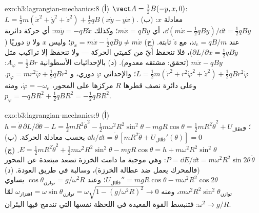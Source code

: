 \begin{solution}{exo:b3:lagrangian-mechanics:8}
(أ) $\vect A = \tfrac12 B(-y, x, 0)$:
$L = \tfrac12 m(\dot x^2 + \dot y^2 + \dot z^2) + \tfrac12 qB(x\dot y -
y\dot x)$. (ب) معادلة $x$: $\dd(m\dot x - \tfrac12 qBy)/\dd t =
\tfrac12 qB\dot y$، أي $m\ddot x = qB\dot y$؛ وكذلك $m\ddot y =
-qB\dot x$: أي حركة دائرية عند $\omega_{\text{c}} = qB/m$، مع $\dot z$
ثابتة. (ج) $p_x = m\dot x - \tfrac12 qBy \neq m\dot x$؛ وليس $x$
ولا $y$ دوريًا ($\partial L/\partial x = \tfrac12 qB\dot y$)، فلا
تنحفظ أيّ من كميتي الحركة --- ولا تنحفظ إلا تراكيب مثل $m\dot x -
qBy$ (تحقق: مشتقه معدوم). (د) بالإحداثيات الأسطوانية
$A_\varphi = \tfrac12 Br$:
$L = \tfrac12 m(\dot r^2 + r^2\dot\varphi^2 + \dot z^2) + \tfrac12
qBr^2\dot\varphi$؛ والإحداثي $\varphi$ دوري، و $p_\varphi = mr^2\dot\varphi +
\tfrac12 qBr^2$. وعلى دائرة نصف قطرها $R$ مركزها على المحور،
$\dot\varphi = -\omega_{\text{c}}$، ومنه $p_\varphi = -qBR^2 + \tfrac12
qBR^2 = -\tfrac12 qBR^2$.
\end{solution}

\begin{solution}{exo:b3:lagrangian-mechanics:9}
(أ) $h = \dot\theta\,\partial L/\partial\dot\theta - L = \tfrac12
mR^2\dot\theta^2 - \tfrac12 m\omega^2R^2\sin^2\theta - mgR\cos\theta =
\tfrac12 mR^2\dot\theta^2 + U_{\text{فعّال}}$؛ و $\dd h/\dd t =
\dot\theta\,[mR^2\ddot\theta + U_{\text{فعّال}}'(\theta)] = 0$ بحسب
معادلة الحركة. (ب) $E = \tfrac12 mR^2\dot\theta^2 + \tfrac12
m\omega^2R^2\sin^2\theta - mgR\cos\theta = h +
m\omega^2R^2\sin^2\theta$. (ج) $P = \dd E/\dd t =
m\omega^2R^2\sin2\theta\,\dot\theta$: وهي موجبة ما دامت الخرزة
تصعد مبتعدة عن المحور (فالمحرك يعمل ضد عطالة الخرزة)، وسالبة في
طريق العودة. (د) $U_{\text{فعّال}}'' = mgR\cos\theta -
m\omega^2R^2\cos2\theta$؛ وعند $\cos\theta_{\text{توازن}} = g/\omega^2R$
يساوي $m\omega^2R^2\sin^2\theta_{\text{توازن}}$، ومنه
$\omega_{\text{اهتزاز}} = \omega\sin\theta_{\text{توازن}} = \omega\sqrt{1 -
(g/\omega^2R)^2} \to 0$ لمّا $\omega^2 \to g/R$: فتنبسط القوة
المعيدة في اللحظة نفسها التي تندمج فيها البئران.
\end{solution}

